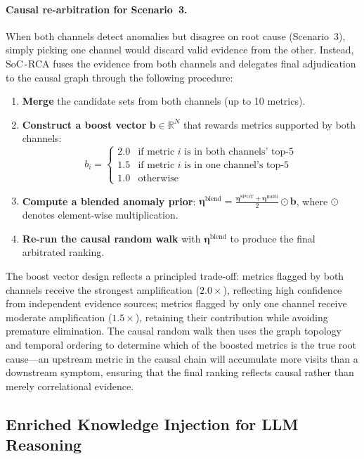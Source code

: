 \documentclass[a4paper,fleqn]{cas-dc}
\newcommand{\sysname}{SoC\texttt{-}RCA}
\begin{document}
\paragraph{Causal re-arbitration for Scenario~3.}
When both channels detect anomalies but disagree on root cause (Scenario~3), simply picking one channel would discard valid evidence from the other.  Instead, \sysname{} fuses the evidence from both channels and delegates final adjudication to the causal graph through the following procedure:
\begin{enumerate}[leftmargin=*]
  \item \textbf{Merge} the candidate sets from both channels (up to 10 metrics).
  \item \textbf{Construct a boost vector} $\mathbf{b} \in \mathbb{R}^N$ that rewards metrics supported by both channels:
  \begin{equation}
    b_i = \begin{cases}
      2.0 & \text{if metric } i \text{ is in both channels' top-5} \\
      1.5 & \text{if metric } i \text{ is in one channel's top-5} \\
      1.0 & \text{otherwise}
    \end{cases}
  \end{equation}
  \item \textbf{Compute a blended anomaly prior}: $\boldsymbol{\eta}^{\text{blend}} = \frac{\boldsymbol{\eta}^{\text{SPOT}} + \boldsymbol{\eta}^{\text{multi}}}{2} \odot \mathbf{b}$, where $\odot$ denotes element-wise multiplication.
  \item \textbf{Re-run the causal random walk} with $\boldsymbol{\eta}^{\text{blend}}$ to produce the final arbitrated ranking.
\end{enumerate}
The boost vector design reflects a principled trade-off: metrics flagged by both channels receive the strongest amplification ($2.0\times$), reflecting high confidence from independent evidence sources; metrics flagged by only one channel receive moderate amplification ($1.5\times$), retaining their contribution while avoiding premature elimination.  The causal random walk then uses the graph topology and temporal ordering to determine which of the boosted metrics is the true root cause---an upstream metric in the causal chain will accumulate more visits than a downstream symptom, ensuring that the final ranking reflects causal rather than merely correlational evidence.


\subsection{Enriched Knowledge Injection for LLM Reasoning}
\label{sec:knowledge}
\end{document}
